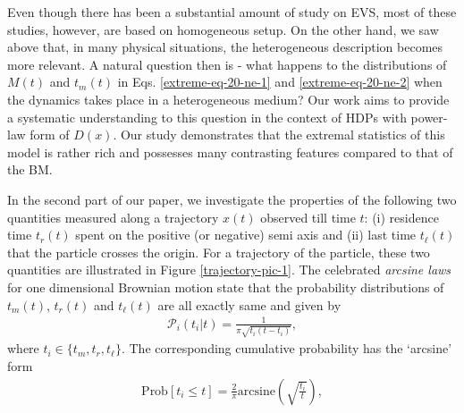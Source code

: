 \documentclass[showpacs,amsmath,amssymb,aps,pre,twocolumn,]{revtex4-1}
\def\bluew#1{{\color{black} #1}}
\begin{document}
Even though there has been a substantial amount of study on EVS, most of these studies, however, are based on homogeneous setup. On the other hand, we saw above that, in many physical situations, the heterogeneous description becomes more relevant. A natural question then is - what happens to the distributions of $M(t)$ and $t_m(t)$ in Eqs. \eqref{extreme-eq-20-ne-1} and \eqref{extreme-eq-20-ne-2} when the dynamics takes place in a heterogeneous medium? Our work aims to provide a systematic understanding to this question in the context of HDPs with power-law form of $D(x)$. Our study demonstrates that the extremal statistics of this model is rather rich and possesses many contrasting features compared to that of the BM. 



In the second part of our paper, we investigate the properties of the following two quantities measured along a trajectory $x(t)$ observed till time $t$: (i) residence time $t_r(t)$ spent on the positive (or negative) semi axis and (ii) last time $t_{\ell}(t)$ that the particle crosses the origin. For a trajectory of the particle, these two quantities are illustrated in Figure \ref{trajectory-pic-1}. The celebrated \textit{arcsine laws} for one dimensional Brownian motion state that the probability distributions of $t_m(t)$, $t_r(t)$ and $t_{\ell}(t)$ are all exactly same and given by \bluew{\cite{Levy, Majumdar005}}
\begin{align}
 \mathcal{P}_i(t_i|t) = \frac{1}{\pi \sqrt{t_i(t-t_i)}},
 \label{eq-1}
\end{align}
where $t_i \in \{ t_m, t_r, t_{\ell}  \}$. The corresponding cumulative probability has the `arcsine' form
\begin{align}
\text{Prob}[t_i \leq t] = \frac{2}{\pi} \text{arcsine}\left( \sqrt{\frac{t_i}{t}}\right),
\label{eq-2}
\end{align}
\end{document}

